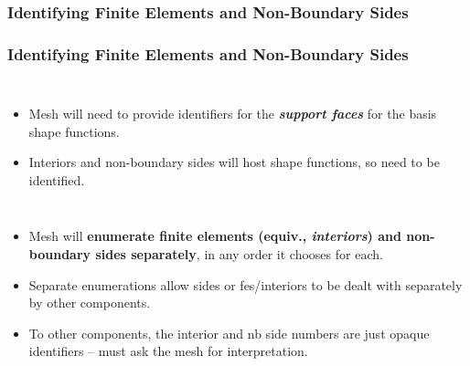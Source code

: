 \documentclass[compress]{beamer}
\begin{document}
\subsubsection{Identifying Finite Elements and Non-Boundary Sides}

\begin{frame}
  \frametitle{Identifying Finite Elements and Non-Boundary Sides}
  \begin{columns}
      \begin{itemize}[<+->]
        \item Mesh will need to provide identifiers for the \emph{\textbf{support faces}} for the basis shape functions.
        \item Interiors and non-boundary sides will host shape functions, so need to be identified.
      \end{itemize}
       {}
               {}
  \end{columns}
  \begin{itemize}[<+->]
    \item Mesh will \textbf{enumerate finite elements (equiv., \emph{interiors}) and non-boundary sides separately}, in any order it chooses for each.
    \item Separate enumerations allow sides or fes/interiors to be dealt with separately by other components.
    \item To other components, the interior and nb side numbers are just opaque identifiers -- must ask the mesh for interpretation.
  \end{itemize}
\end{frame}
 
\end{document}
